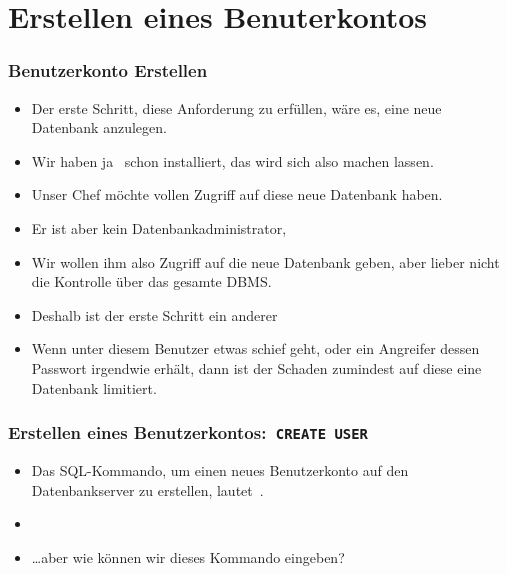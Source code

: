 \documentclass[aspectratio=169,mathserif,notheorems]{beamer}%
\begin{document}
\section{Erstellen eines Benuterkontos}%
%
\begin{frame}%
\frametitle{Benutzerkonto Erstellen}%
\begin{itemize}%
\item Der erste Schritt, diese Anforderung zu erfüllen, wäre es, eine neue Datenbank anzulegen.%
\item<2-> Wir haben ja \postgresql\ schon installiert, das wird sich also machen lassen.%
\item<3-> Unser Chef möchte vollen Zugriff auf diese neue Datenbank haben.%
\item<4-> Er ist aber kein Datenbankadministrator,
\item<5-> Wir wollen ihm also Zugriff auf die neue Datenbank geben, aber lieber nicht die Kontrolle über das gesamte DBMS.%
\item<6-> Deshalb ist der erste Schritt ein anderer
\item<8-> Wenn unter diesem Benutzer etwas schief geht, oder ein Angreifer dessen Passwort irgendwie erhält, dann ist der Schaden zumindest auf diese eine Datenbank limitiert.%
\end{itemize}%
\end{frame}%
%
\begin{frame}[t]
\frametitle{Erstellen eines Benutzerkontos:~\texttt{CREATE USER}}%
\begin{itemize}%
\item Das SQL-Kommando, um einen neues Benutzerkonto auf den Datenbankserver zu erstellen, lautet~.%
\item<2-> %
\item<4-> {\dots}aber wie können wir dieses Kommando eingeben?
\end{itemize}%
%
\end{frame}
%
\end{document}
